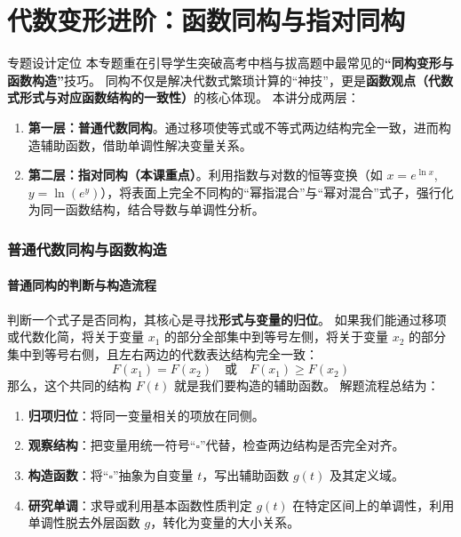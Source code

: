 \documentclass[11pt,a4paper]{ctexart}
\begin{document}
\newpage
\part{代数变形进阶：函数同构与指对同构}

\begin{teachbox}{专题设计定位}
本专题重在引导学生突破高考中档与拔高题中最常见的\textbf{“同构变形与函数构造”}技巧。
同构不仅是解决代数式繁琐计算的“神技”，更是\textbf{函数观点（代数式形式与对应函数结构的一致性）}的核心体现。
本讲分成两层：
\begin{enumerate}
  \item \textbf{第一层：普通代数同构}。通过移项使等式或不等式两边结构完全一致，进而构造辅助函数，借助单调性解决变量关系。
  \item \textbf{第二层：指对同构（本课重点）}。利用指数与对数的恒等变换（如 $x=e^{\ln x}$, $y=\ln(e^y)$），将表面上完全不同构的“幂指混合”与“幂对混合”式子，强行化为同一函数结构，结合导数与单调性分析。
\end{enumerate}
\end{teachbox}

\section{普通代数同构与函数构造}

\subsection{普通同构的判断与构造流程}
判断一个式子是否同构，其核心是寻找\textbf{形式与变量的归位}。
如果我们能通过移项或代数化简，将关于变量 $x_1$ 的部分全部集中到等号左侧，将关于变量 $x_2$ 的部分集中到等号右侧，且左右两边的代数表达结构完全一致：
\[
F(x_1) = F(x_2) \quad \text{或} \quad F(x_1) \ge F(x_2)
\]
那么，这个共同的结构 $F(t)$ 就是我们要构造的辅助函数。
解题流程总结为：
\begin{enumerate}
  \item \textbf{归项归位}：将同一变量相关的项放在同侧。
  \item \textbf{观察结构}：把变量用统一符号“$\square$”代替，检查两边结构是否完全对齐。
  \item \textbf{构造函数}：将“$\square$”抽象为自变量 $t$，写出辅助函数 $g(t)$ 及其定义域。
  \item \textbf{研究单调}：求导或利用基本函数性质判定 $g(t)$ 在特定区间上的单调性，利用单调性脱去外层函数 $g$，转化为变量的大小关系。
\end{enumerate}
\end{document}
